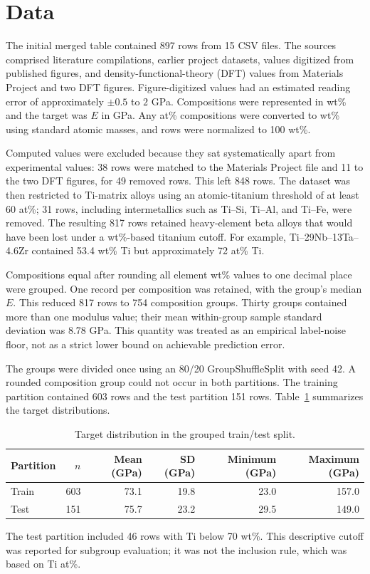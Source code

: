 \documentclass[11pt,oneside]{article}
\begin{document}
\section{Data}
The initial merged table contained 897 rows from 15 CSV files. The sources comprised literature compilations, earlier project datasets, values digitized from published figures, and density-functional-theory (DFT) values from Materials Project and two DFT figures. Figure-digitized values had an estimated reading error of approximately \(\pm 0.5\) to \(2\) GPa. Compositions were represented in wt\% and the target was \(E\) in GPa. Any at\% compositions were converted to wt\% using standard atomic masses, and rows were normalized to 100 wt\%.

Computed values were excluded because they sat systematically apart from experimental values: 38 rows were matched to the Materials Project file and 11 to the two DFT figures, for 49 removed rows. This left 848 rows. The dataset was then restricted to Ti-matrix alloys using an atomic-titanium threshold of at least 60 at\%; 31 rows, including intermetallics such as Ti--Si, Ti--Al, and Ti--Fe, were removed. The resulting 817 rows retained heavy-element beta alloys that would have been lost under a wt\%-based titanium cutoff. For example, Ti--29Nb--13Ta--4.6Zr contained 53.4 wt\% Ti but approximately 72 at\% Ti.

Compositions equal after rounding all element wt\% values to one decimal place were grouped. One record per composition was retained, with the group's median \(E\). This reduced 817 rows to 754 composition groups. Thirty groups contained more than one modulus value; their mean within-group sample standard deviation was 8.78 GPa. This quantity was treated as an empirical label-noise floor, not as a strict lower bound on achievable prediction error.

The groups were divided once using an 80/20 GroupShuffleSplit with seed 42. A rounded composition group could not occur in both partitions. The training partition contained 603 rows and the test partition 151 rows. Table~\ref{tab:split} summarizes the target distributions.

\begin{table}[H]
\centering
\caption{Target distribution in the grouped train/test split.}
\label{tab:split}
\begin{tabular}{lrrrrr}
\toprule
Partition & \(n\) & Mean (GPa) & SD (GPa) & Minimum (GPa) & Maximum (GPa)\\
\midrule
Train & 603 & 73.1 & 19.8 & 23.0 & 157.0\\
Test & 151 & 75.7 & 23.2 & 29.5 & 149.0\\
\bottomrule
\end{tabular}
\end{table}
The test partition included 46 rows with Ti below 70 wt\%. This descriptive cutoff was reported for subgroup evaluation; it was not the inclusion rule, which was based on Ti at\%.
\end{document}
